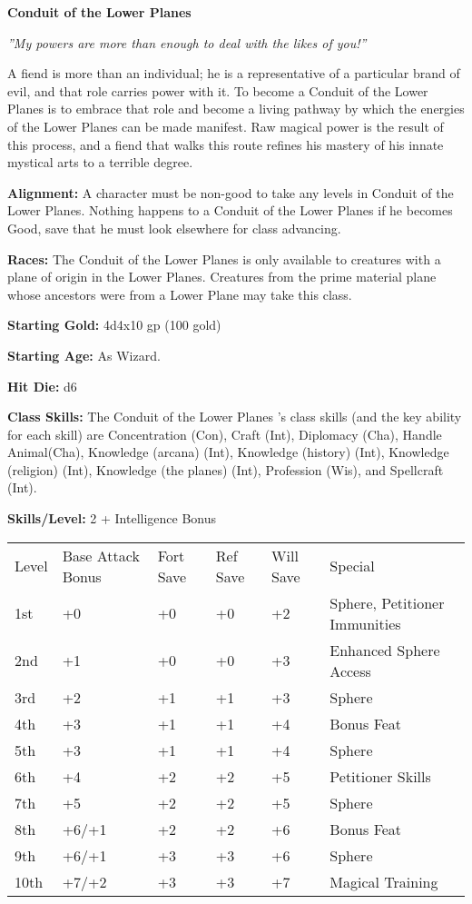 \documentclass[10pt]{article}
\newcommand{\ability}[2]{\smallskip \textbf{#1} #2}
\newcommand{\classname}[1]{{\huge \textbf{#1}}}
\newcommand{\quot}[1]{\emph{#1}\bigskip}
\newcommand{\desc}[1]{#1 \medskip}
\begin{document}
\classname{Conduit of the Lower Planes}

\quot{''My powers are more than enough to deal with the likes of you!''}

\desc{A fiend is more than an individual; he is a representative of a particular brand of evil, and that role carries power with it. To become a Conduit of the Lower Planes is to embrace that role and become a living pathway by which the energies of the Lower Planes can be made manifest. Raw magical power is the result of this process, and a fiend that walks this route refines his mastery of his innate mystical arts to a terrible degree.}

\ability{Alignment:}{ A character must be non-good to take any levels in Conduit of the Lower Planes. Nothing happens to a Conduit of the Lower Planes if he becomes Good, save that he must look elsewhere for class advancing.}

\ability{Races:}{ The Conduit of the Lower Planes is only available to creatures with a plane of origin in the Lower Planes. Creatures from the prime material plane whose ancestors were from a Lower Plane may take this class.}

\ability{Starting Gold:}{ 4d4x10 gp (100 gold)}

\ability{Starting Age:}{ As Wizard.}

\ability{Hit Die:}{ d6}

\ability{Class Skills:}{ The Conduit of the Lower Planes 's class skills (and the key ability for each skill) are Concentration (Con), Craft (Int), Diplomacy (Cha), Handle Animal(Cha), Knowledge (arcana) (Int), Knowledge (history) (Int), Knowledge (religion) (Int), Knowledge (the planes) (Int), Profession (Wis), and Spellcraft (Int).}

\ability{Skills/Level:}{ 2 + Intelligence Bonus}

\begin{table}[tbh]
\begin{small}
\begin{tabular}{lp{2cm}p{1cm}p{1cm}p{1cm}l}
Level  &Base Attack Bonus &Fort  Save &Ref Save &Will Save &Special\\
1st &+0 &+0 &+0 &+2 &Sphere, Petitioner Immunities\\
2nd &+1 &+0 &+0 &+3 &Enhanced Sphere Access\\
3rd &+2 &+1 &+1 &+3 &Sphere\\
4th &+3 &+1 &+1 &+4 &Bonus Feat\\
5th &+3 &+1 &+1 &+4 &Sphere\\
6th &+4 &+2 &+2 &+5 &Petitioner Skills\\
7th &+5 &+2 &+2 &+5 &Sphere\\
8th &+6/+1 &+2 &+2 &+6 &Bonus Feat\\
9th &+6/+1 &+3 &+3 &+6 &Sphere\\
10th &+7/+2 &+3 &+3 &+7 &Magical Training\\
\end{tabular}
\end{small}
\end{table}
\end{document}
